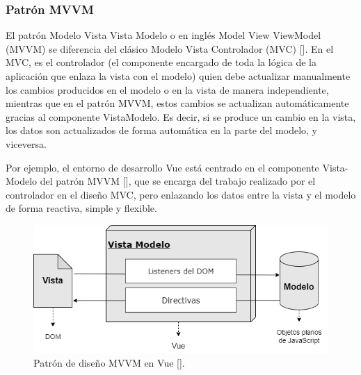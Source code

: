 \subsubsection{Patrón MVVM}

El patrón Modelo Vista Vista Modelo o en inglés Model View ViewModel (MVVM) se diferencia del clásico Modelo Vista Controlador (MVC) [\cite{45}]. En el MVC, es el controlador (el componente encargado de toda la lógica de la aplicación que enlaza la vista con el modelo) quien debe actualizar manualmente los cambios producidos en el modelo o en la vista de manera independiente, mientras que en el patrón MVVM, estos cambios se actualizan automáticamente gracias al componente VistaModelo. Es decir, si se produce un cambio en la vista, los datos son actualizados de forma automática en la parte del modelo, y viceversa.

Por ejemplo, el entorno de desarrollo Vue está centrado en el componente Vista-Modelo del patrón MVVM [\cite{49,47}], que se encarga del trabajo realizado por el controlador en el diseño MVC, pero enlazando los datos entre la vista y el modelo de forma reactiva, simple y flexible.

\begin{figure}[htbp]
\centering
\includegraphics[scale=0.6]{Graphics/mvvm}
\caption{Patrón de diseño MVVM en Vue [\cite{47}].}
\label{fig:vmmv}
\end{figure}


